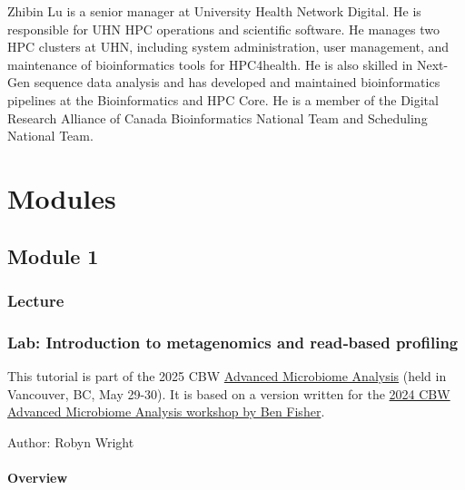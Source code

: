 \documentclass[
]{book}
\begin{document}
Zhibin Lu is a senior manager at University Health Network Digital. He is responsible for UHN
HPC operations and scientific software. He manages two HPC clusters at UHN, including
system administration, user management, and maintenance of bioinformatics tools for
HPC4health. He is also skilled in Next-Gen sequence data analysis and has developed and
maintained bioinformatics pipelines at the Bioinformatics and HPC Core. He is a member of the
Digital Research Alliance of Canada Bioinformatics National Team and Scheduling National
Team.

\part{Modules}\label{part-modules}

\chapter{Module 1}\label{module-1}

\section{Lecture}\label{lecture}

\section{Lab: Introduction to metagenomics and read‐based profiling}\label{lab-introduction-to-metagenomics-and-readbased-profiling}

This tutorial is part of the 2025 CBW \href{https://bioinformaticsdotca.github.io/AMB_2025/}{Advanced Microbiome Analysis} (held in Vancouver, BC, May 29-30). It is based on a version written for the \href{https://bioinformaticsdotca.github.io/AMB_2024_module1}{2024 CBW Advanced Microbiome Analysis workshop by Ben Fisher}.

Author: Robyn Wright

\subsection{Overview}\label{overview}
\end{document}
